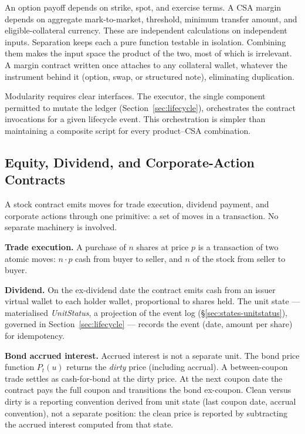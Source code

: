 \noindent An option payoff depends on strike, spot, and exercise terms. A CSA margin depends on aggregate mark-to-market, threshold, minimum transfer amount, and eligible-collateral currency. These are independent calculations on independent inputs. Separation keeps each a pure function testable in isolation. Combining them makes the input space the product of the two, most of which is irrelevant. A margin contract written once attaches to any collateral wallet, whatever the instrument behind it (option, swap, or structured note), eliminating duplication.

Modularity requires clear interfaces. The executor, the single component permitted to mutate the ledger (Section~\ref{sec:lifecycle}), orchestrates the contract invocations for a given lifecycle event. This orchestration is simpler than maintaining a composite script for every product--CSA combination.

\subsection{Equity, Dividend, and Corporate-Action Contracts}

A stock contract emits moves for trade execution, dividend payment, and corporate actions through one primitive: a set of moves in a transaction. No separate machinery is involved.

\noindent\textbf{Trade execution.} A purchase of $n$ shares at price $p$ is a transaction of two atomic moves: $n \cdot p$ cash from buyer to seller, and $n$ of the stock from seller to buyer.

\noindent\textbf{Dividend.} On the ex-dividend date the contract emits cash from an issuer virtual wallet to each holder wallet, proportional to shares held. The unit state --- materialised \emph{UnitStatus}, a projection of the event log (\S\ref{sec:states-unitstatus}), governed in Section~\ref{sec:lifecycle} --- records the event (date, amount per share) for idempotency.

\noindent\textbf{Bond accrued interest.} Accrued interest is not a separate unit. The bond price function $P_t(u)$ returns the \emph{dirty} price (including accrual). A between-coupon trade settles as cash-for-bond at the dirty price. At the next coupon date the contract pays the full coupon and transitions the bond ex-coupon. Clean versus dirty is a reporting convention derived from unit state (last coupon date, accrual convention), not a separate position: the clean price is reported by subtracting the accrued interest computed from that state.

